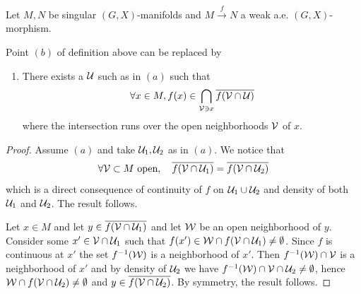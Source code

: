 \begin{lem}\label{lem:singular_manifolds_weak_morphism}
 Let $M,N$ be singular $(G,X)$-manifolds and $M\xrightarrow{f} N$ a weak a.e. $(G,X)$-morphism.

 Point $(b)$ of definition above can be replaced by 
 \begin{enumerate}
  \item[(b')] There exists a $\mathcal{U}$ such as in $(a)$ such that 
 $$\forall x\in M, f(x) \in \bigcap_{\mathcal V\ni x} \overline {f(\mathcal V\cap \mathcal{U})}$$
 where the intersection runs over the open neighborhoods $\mathcal V$ of $x$. 
 \end{enumerate}

\end{lem}
\begin{proof} Assume $(a)$ and take $\mathcal{U}_1,\mathcal{U}_2$ as in $(a)$. 
We notice that
$$\forall \mathcal V\subset M \text{ open}, \quad \overline {f(\mathcal V\cap \mathcal{U}_1)} =   \overline {f(\mathcal V\cap \mathcal{U}_2)}$$
which is a direct consequence of continuity of $f$ on $\mathcal{U}_1\cup \mathcal{U}_2$ and density of both $\mathcal{U}_1$ and $\mathcal{U}_2$.
The result follows.

Let $x\in M$ and let $y\in \overline {f(\mathcal V\cap \mathcal{U}_1)}$ and let $\mathcal W$ be an open neighborhood of $y$. Consider some $x'\in \mathcal V\cap \mathcal{U}_1$ such that $f(x')\in \mathcal W \cap f(\mathcal V\cap \mathcal{U}_1)\neq \emptyset$. Since $f$ is continuous at $x'$ the set $f^{-1}(\mathcal W)$ is a neighborhood of $x'$. Then $f^{-1}(\mathcal W)\cap \mathcal V$ is a neighborhood of  $x'$ and by density of $\mathcal{U}_2$ we have $f^{-1}(\mathcal W)\cap\mathcal V\cap\mathcal{U}_2 \neq \emptyset$, hence $\mathcal W\cap f(\mathcal V\cap\mathcal{U}_2) \neq \emptyset$ and $y\in \overline {f(\mathcal V\cap \mathcal{U}_2)}$. By symmetry, the result follows.

\end{proof}



